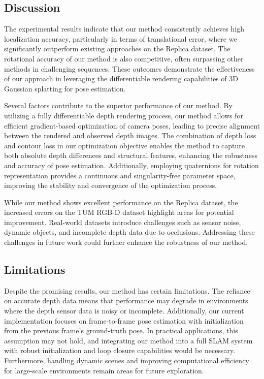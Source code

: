 \documentclass[twocolumn]{article} %
\begin{document}
\subsection{Discussion}\label{discussion}

The experimental results indicate that our method consistently achieves
high localization accuracy, particularly in terms of translational
error, where we significantly outperform existing approaches on the
Replica dataset. The rotational accuracy of our method is also
competitive, often surpassing other methods in challenging sequences.
These outcomes demonstrate the effectiveness of our approach in
leveraging the differentiable rendering capabilities of 3D Gaussian
splatting for pose estimation.

Several factors contribute to the superior performance of our method. By
utilizing a fully differentiable depth rendering process, our method
allows for efficient gradient-based optimization of camera poses,
leading to precise alignment between the rendered and observed depth
images. The combination of depth loss and contour loss in our
optimization objective enables the method to capture both absolute depth
differences and structural features, enhancing the robustness and
accuracy of pose estimation. Additionally, employing quaternions for
rotation representation provides a continuous and singularity-free
parameter space, improving the stability and convergence of the
optimization process.

While our method shows excellent performance on the Replica dataset, the
increased errors on the TUM RGB-D dataset highlight areas for potential
improvement. Real-world datasets introduce challenges such as sensor
noise, dynamic objects, and incomplete depth data due to occlusions.
Addressing these challenges in future work could further enhance the
robustness of our method.

\subsection{Limitations}\label{limitations}

Despite the promising results, our method has certain limitations. The
reliance on accurate depth data means that performance may degrade in
environments where the depth sensor data is noisy or incomplete.
Additionally, our current implementation focuses on frame-to-frame pose
estimation with initialization from the previous frame's ground-truth
pose. In practical applications, this assumption may not hold, and
integrating our method into a full SLAM system with robust
initialization and loop closure capabilities would be necessary.
Furthermore, handling dynamic scenes and improving computational
efficiency for large-scale environments remain areas for future
exploration.
\end{document}
